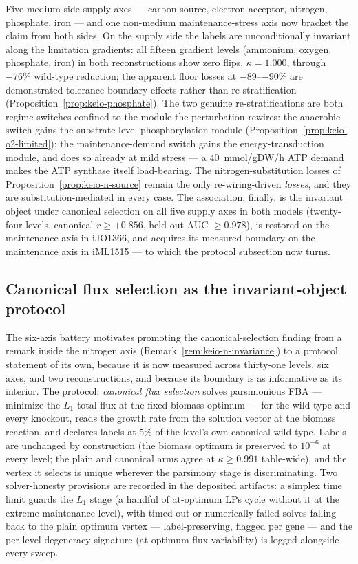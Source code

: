 \begin{remark}
\label{rem:keio-multiaxis}
Five medium-side supply axes --- carbon source, electron acceptor,
nitrogen, phosphate, iron --- and one non-medium maintenance-stress
axis now bracket the claim from both sides. On the supply side the
labels are unconditionally invariant along the limitation gradients:
all fifteen gradient levels (ammonium, oxygen, phosphate, iron) in
both reconstructions show zero flips, $\kappa=1.000$, through
$-76\%$ wild-type reduction; the apparent floor losses at
$-89$--$-90\%$ are demonstrated tolerance-boundary effects rather
than re-stratification
(Proposition~\ref{prop:keio-phosphate}). The two genuine
re-stratifications are both regime switches confined to the module
the perturbation rewires: the anaerobic switch gains the
substrate-level-phosphorylation module
(Proposition~\ref{prop:keio-o2-limited}); the maintenance-demand
switch gains the energy-transduction module, and does so already
at mild stress --- a $40$~mmol/gDW/h ATP demand makes the ATP
synthase itself load-bearing. The nitrogen-substitution losses of
Proposition~\ref{prop:keio-n-source} remain the only
re-wiring-driven \emph{losses}, and they are substitution-mediated
in every case. The association, finally, is the invariant object
under canonical selection on all five supply axes in both models
(twenty-four levels, canonical $r\ge+0.856$, held-out AUC
$\ge0.978$), is restored on the maintenance axis in iJO1366, and
acquires its measured boundary on the maintenance axis in iML1515
--- to which the protocol subsection now turns.
\end{remark}

\subsection{Canonical flux selection as the invariant-object
protocol}\label{sec:canonical-selection}

The six-axis battery motivates promoting the canonical-selection
finding from a remark inside the nitrogen axis
(Remark~\ref{rem:keio-n-invariance}) to a protocol statement of
its own, because it is now measured across thirty-one levels, six
axes, and two reconstructions, and because its boundary is as
informative as its interior. The protocol: \emph{canonical flux
selection} solves parsimonious FBA --- minimize the $L_1$ total
flux at the fixed biomass optimum --- for the wild type and every
knockout, reads the growth rate from the solution vector at the
biomass reaction, and declares labels at $5\%$ of the level's own
canonical wild type. Labels are unchanged by construction (the
biomass optimum is preserved to $10^{-6}$ at every level; the
plain and canonical arms agree at $\kappa\ge0.991$ table-wide),
and the vertex it selects is unique wherever the parsimony stage
is discriminating. Two solver-honesty provisions are recorded in
the deposited artifacts: a simplex time limit guards the $L_1$
stage (a handful of at-optimum LPs cycle without it at the extreme
maintenance level), with timed-out or numerically failed solves
falling back to the plain optimum vertex --- label-preserving,
flagged per gene --- and the per-level degeneracy signature
(at-optimum flux variability) is logged alongside every sweep.

